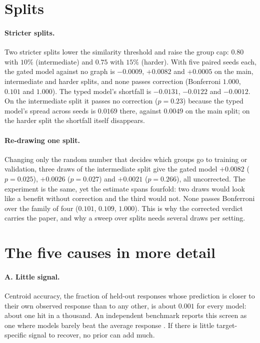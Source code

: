 \documentclass{article}
\begin{document}
\section{Splits}
\label{app:folds}

\paragraph{Stricter splits.} Two stricter splits lower the similarity threshold and raise the group cap:
$0.80$ with $10\%$ (intermediate) and $0.75$ with $15\%$ (harder). With five paired seeds each, the gated
model against no graph is $-0.0009$, $+0.0082$ and $+0.0005$ on the main, intermediate and harder splits,
and none passes correction (Bonferroni $1.000$, $0.101$ and $1.000$). The typed model's shortfall is
$-0.0131$, $-0.0122$ and $-0.0012$. On the intermediate split it passes no correction ($p=0.23$) because
the typed model's spread across seeds is $0.0169$ there, against $0.0049$ on the main split; on the harder
split the shortfall itself disappears.

\paragraph{Re-drawing one split.} Changing only the random number that decides which groups go to training
or validation, three draws of the intermediate split give the gated model $+0.0082$ ($p=0.025$),
$+0.0026$ ($p=0.027$) and $+0.0021$ ($p=0.266$), all uncorrected. The experiment is the same, yet the
estimate spans fourfold: two draws would look like a benefit without correction and the third would not.
None passes Bonferroni over the family of four ($0.101$, $0.109$, $1.000$). This is why the corrected
verdict carries the paper, and why a sweep over splits needs several draws per setting.

\section{The five causes in more detail}
\label{app:causes}

\paragraph{A. Little signal.} Centroid accuracy, the fraction of held-out responses whose prediction is
closer to their own observed response than to any other, is about $0.001$ for every model: about one hit
in a thousand. An independent benchmark reports this
screen as one where models barely beat the average response \citep{royer2026tfm}. If there is little
target-specific signal to recover, no prior can add much.
\end{document}
